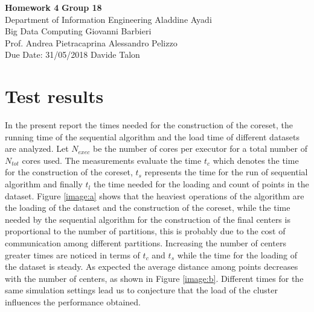 \documentclass[a4paper, 11pt]{article}
\begin{document}
\noindent
\large\textbf{Homework 4} \hfill \textbf{Group 18} \\
\normalsize Department of Information Engineering \hfill Aladdine Ayadi\\
Big Data Computing \hfill Giovanni Barbieri\\
Prof. Andrea Pietracaprina \hfill Alessandro Pelizzo\\
Due Date: 31/05/2018 \hfill Davide Talon


\section*{Test results}
In the present report the times needed for the construction of the coreset, the running time of the sequential algorithm and the load time of different datasets are analyzed.
Let $N_{exec}$ be the number of cores per executor for a total number of $N_{tot}$  cores used. The measurements evaluate the time $t_c$ which denotes the time for the construction of the coreset, $t_s$ represents the time for the run of sequential algorithm and finally $t_l$ the time needed for the loading and count of points in the dataset.
Figure \ref{image:a} shows that the heaviest operations of the algorithm are the loading of the dataset and the construction of the coreset,  while the time needed by the sequential algorithm for the construction of the final centers is proportional to the number of partitions, this is probably due to the cost of communication among different partitions.
Increasing the number of centers greater times are noticed  in terms of $t_c$ and $t_s$ while the time for the loading of the dataset is steady. As expected the average distance among points decreases with the number of centers, as shown in Figure \ref{image:b}.
Different times for the same simulation settings lead us to conjecture that the load of the cluster influences the performance obtained.
\end{document}
